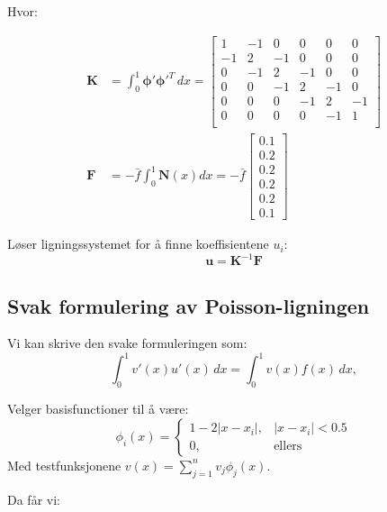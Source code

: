 Hvor:

\begin{align*}
    \symbf{K} & = \int_0^1 \symbf{\phi}' \symbf{\phi}'^T \, dx =
    \begin{bmatrix}
        1  & -1 & 0  & 0  & 0  & 0  \\
        -1 & 2  & -1 & 0  & 0  & 0  \\
        0  & -1 & 2  & -1 & 0  & 0  \\
        0  & 0  & -1 & 2  & -1 & 0  \\
        0  & 0  & 0  & -1 & 2  & -1 \\
        0  & 0  & 0  & 0  & -1 & 1  \\
    \end{bmatrix}                                  \\
    \symbf{F} & = - \bar{f} \int_0^1 \symbf{N}(x) dx
    = - \bar{f}
    \begin{bmatrix}
        0.1 \\ 0.2 \\ 0.2 \\ 0.2 \\ 0.2 \\ 0.1
    \end{bmatrix}
\end{align*}

Løser ligningssystemet for å finne koeffisientene \(u_i\):
\[
    \symbf{u} = \symbf{K}^{-1} \symbf{F}
\]

\subsection{Svak formulering av Poisson-ligningen}
Vi kan skrive den svake formuleringen som:
\[
    \int_0^1 v'(x) u'(x) \, dx = \int_0^1 v(x) f(x) \, dx,
\]

Velger basisfunctioner til å være:
\[
    \phi_i(x) = \begin{cases}
        1 - 2|x - x_i|, & |x - x_i| < 0.5 \\
        0,              & \text{ellers}
    \end{cases}
\]
Med testfunksjonene \(v(x) = \sum_{j=1}^n v_j \phi_j(x)\).

Da får vi:

